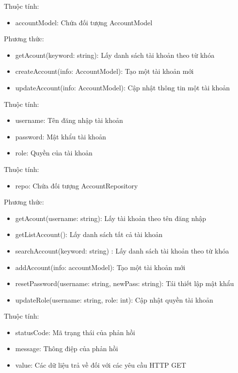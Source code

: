 Thuộc tính:
\begin{itemize}
	\item accountModel: Chứa đối tượng AccountModel
\end{itemize}
Phương thức:
\begin{itemize}
	\item getAcount(keyword: string): Lấy danh sách tài khoản theo từ khóa
	\item createAccount(info: AccountModel): Tạo một tài khoản mới
	\item updateAccount(info: AccountModel): Cập nhật thông tin một tài khoản
\end{itemize}

Thuộc tính:
\begin{itemize}
	\item username: Tên đăng nhập tài khoản
	\item password: Mật khẩu tài khoản
	\item role: Quyền của tài khoản
\end{itemize}

Thuộc tính:
\begin{itemize}
	\item repo: Chứa đối tượng AccountRepository
\end{itemize}
Phương thức:
\begin{itemize}
	\item getAcount(username: string): Lấy tài khoản theo tên đăng nhập
	\item getListAccount(): Lấy danh sách tất cả tài khoản
	\item searchAccount(keyword: string) : Lấy danh sách tài khoản theo từ khóa
	\item addAccount(info: accountModel): Tạo một tài khoản mới
	\item resetPassword(username: string, newPass: string): Tái thiết lập mật khẩu	
	\item updateRole(username: string, role: int): Cập nhật quyền tài khoản
\end{itemize}


Thuộc tính:
\begin{itemize}
	\item statusCode: Mã trạng thái của phản hồi
	\item message: Thông điệp của phản hồi
	\item value: Các dữ liệu trả về đối với các yêu cầu HTTP GET
\end{itemize}




